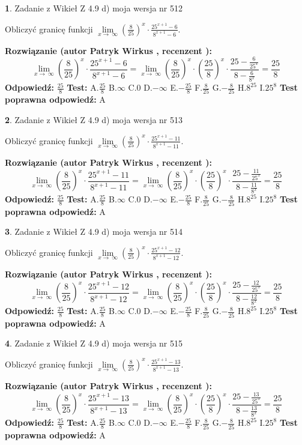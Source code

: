 \documentclass[12pt, a4paper]{article}
\theoremstyle{definition} %
\newtheorem{zad}{}
\newcommand{\zadStart}[1]{\begin{zad}#1\newline}
\newcommand{\zadStop}{\end{zad}}
\newcommand{\rozwStart}[2]{\noindent \textbf{Rozwiązanie (autor #1 , recenzent #2): }\newline}
\newcommand{\rozwStop}{\newline}
\newcommand{\odpStart}{\noindent \textbf{Odpowiedź:}\newline}
\newcommand{\odpStop}{\newline}
\newcommand{\testStart}{\noindent \textbf{Test:}\newline}
\newcommand{\testStop}{\newline}
\newcommand{\kluczStart}{\noindent \textbf{Test poprawna odpowiedź:}\newline}
\newcommand{\kluczStop}{\newline}
\begin{document}
\zadStart{Zadanie z Wikieł Z 4.9 d) moja wersja nr 512}


Obliczyć granicę funkcji  $\lim\limits_{x\to\ \infty}(\frac{8}{25})^{x}\cdot\frac{25^{x+1}-6}{8^{x+1}-6}$.
\zadStop
\rozwStart{Patryk Wirkus}{}
$$\lim\limits_{x\to\ \infty}(\frac{8}{25})^{x}\cdot\frac{25^{x+1}-6}{8^{x+1}-6}=\lim\limits_{x\to\ \infty}(\frac{8}{25})^{x}\cdot(\frac{25}{8})^{x} \cdot \frac{25-\frac{6}{25^{x}}}{8-\frac{6}{8^{x}}} = \frac{25}{8}$$
\rozwStop
\odpStart
$\frac{25}{8}$
\odpStop
\testStart
A.$\frac{25}{8}$ B.$\infty$ C.$0$ D.$-\infty$ E.$-\frac{25}{8}$
F.$\frac{8}{25}$ G.$-\frac{8}{25}$
H.$8^{25}$
I.$25^{8}$
\testStop
\kluczStart
A
\kluczStop



\zadStart{Zadanie z Wikieł Z 4.9 d) moja wersja nr 513}


Obliczyć granicę funkcji  $\lim\limits_{x\to\ \infty}(\frac{8}{25})^{x}\cdot\frac{25^{x+1}-11}{8^{x+1}-11}$.
\zadStop
\rozwStart{Patryk Wirkus}{}
$$\lim\limits_{x\to\ \infty}(\frac{8}{25})^{x}\cdot\frac{25^{x+1}-11}{8^{x+1}-11}=\lim\limits_{x\to\ \infty}(\frac{8}{25})^{x}\cdot(\frac{25}{8})^{x} \cdot \frac{25-\frac{11}{25^{x}}}{8-\frac{11}{8^{x}}} = \frac{25}{8}$$
\rozwStop
\odpStart
$\frac{25}{8}$
\odpStop
\testStart
A.$\frac{25}{8}$ B.$\infty$ C.$0$ D.$-\infty$ E.$-\frac{25}{8}$
F.$\frac{8}{25}$ G.$-\frac{8}{25}$
H.$8^{25}$
I.$25^{8}$
\testStop
\kluczStart
A
\kluczStop



\zadStart{Zadanie z Wikieł Z 4.9 d) moja wersja nr 514}


Obliczyć granicę funkcji  $\lim\limits_{x\to\ \infty}(\frac{8}{25})^{x}\cdot\frac{25^{x+1}-12}{8^{x+1}-12}$.
\zadStop
\rozwStart{Patryk Wirkus}{}
$$\lim\limits_{x\to\ \infty}(\frac{8}{25})^{x}\cdot\frac{25^{x+1}-12}{8^{x+1}-12}=\lim\limits_{x\to\ \infty}(\frac{8}{25})^{x}\cdot(\frac{25}{8})^{x} \cdot \frac{25-\frac{12}{25^{x}}}{8-\frac{12}{8^{x}}} = \frac{25}{8}$$
\rozwStop
\odpStart
$\frac{25}{8}$
\odpStop
\testStart
A.$\frac{25}{8}$ B.$\infty$ C.$0$ D.$-\infty$ E.$-\frac{25}{8}$
F.$\frac{8}{25}$ G.$-\frac{8}{25}$
H.$8^{25}$
I.$25^{8}$
\testStop
\kluczStart
A
\kluczStop



\zadStart{Zadanie z Wikieł Z 4.9 d) moja wersja nr 515}


Obliczyć granicę funkcji  $\lim\limits_{x\to\ \infty}(\frac{8}{25})^{x}\cdot\frac{25^{x+1}-13}{8^{x+1}-13}$.
\zadStop
\rozwStart{Patryk Wirkus}{}
$$\lim\limits_{x\to\ \infty}(\frac{8}{25})^{x}\cdot\frac{25^{x+1}-13}{8^{x+1}-13}=\lim\limits_{x\to\ \infty}(\frac{8}{25})^{x}\cdot(\frac{25}{8})^{x} \cdot \frac{25-\frac{13}{25^{x}}}{8-\frac{13}{8^{x}}} = \frac{25}{8}$$
\rozwStop
\odpStart
$\frac{25}{8}$
\odpStop
\testStart
A.$\frac{25}{8}$ B.$\infty$ C.$0$ D.$-\infty$ E.$-\frac{25}{8}$
F.$\frac{8}{25}$ G.$-\frac{8}{25}$
H.$8^{25}$
I.$25^{8}$
\testStop
\kluczStart
A
\kluczStop
\end{document}
